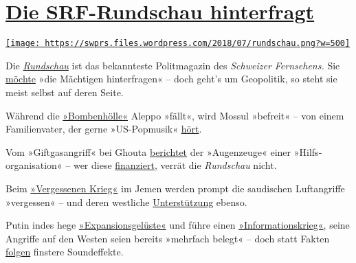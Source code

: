 \hypertarget{die-srf-rundschau-hinterfragt}{%
\section{\texorpdfstring{\href{https://swprs.org/2017/03/01/srf-rundschau/}{Die
SRF-Rundschau
hinterfragt}}{Die SRF-Rundschau hinterfragt}}\label{die-srf-rundschau-hinterfragt}}

\href{https://swprs.org/2017/03/01/srf-rundschau/}{\texttt{[image: https://swprs.files.wordpress.com/2018/07/rundschau.png?w=500]}}

Die
\emph{\href{https://de.wikipedia.org/wiki/Rundschau_(SRF)}{Rundschau}}
ist das bekannteste Polit­ma­ga­zin des \emph{Schweizer Fernsehens.} Sie
\href{https://www.srf.ch/sendungen/rundschau/50-jahre-rundschau-die-jubilaeumssendung}{möchte}
»die Mächtigen hinterfragen« -- doch geht's um Geo­po­litik, so steht
sie meist selbst auf deren Seite.

Während die
\href{https://www.srf.ch/sendungen/rundschau/subventionierte-piloten-vaeter-am-limit-bombenhoelle-aleppo}{»Bombenhölle«}
Aleppo »fällt«, wird Mossul »befreit« -- von einem Familien­vater, der
gerne »US-Popmusik«
\href{https://www.srf.ch/sendungen/rundschau/buben-beschneidung-michel-bollag-pkb-west-mossul}{hört}.

Vom »Giftgasangriff« bei Ghouta
\href{https://www.srf.ch/sendungen/rundschau/kriminaltouristen-verhuetungsmittel-j-bitzer-giftgaseinsatz}{berichtet}
der »Augen­zeuge« einer »Hilfs­organisation« -- wer diese
\href{http://www.uossm.org/who_we_are}{finanziert}, verrät die
\emph{Rundschau} nicht.

Beim
\href{https://www.srf.ch/sendungen/rundschau/gehorsam-und-ehelos-klamauk-statt-kompromiss-vergessener-krieg}{»Vergessenen
Krieg«} im Jemen werden prompt die saudischen Luftangriffe »vergessen«
-- und deren westliche
\href{https://www.strategic-culture.org/news/2018/06/18/western-media-whitewash-yemen-genocide.html}{Unterstützung}
ebenso.

Putin indes hege
\href{https://www.srf.ch/sendungen/rundschau/gianni-infantino-fatma-samoura-iv-kosovaren-zittern-vor-russen}{»Expansionsgelüste«}
und füh­re einen
\href{https://www.srf.ch/sendungen/rundschau/putins-informationskrieg-milliarden-jongleur-bastos-camorra}{»Informationskrieg«},
seine Angriffe auf den Westen seien bereits »mehrfach be­legt« -- doch
statt Fakten
\href{https://www.srf.ch/sendungen/rundschau/putins-informationskrieg-milliarden-jongleur-bastos-camorra}{folgen}
finstere Sound­effekte.

